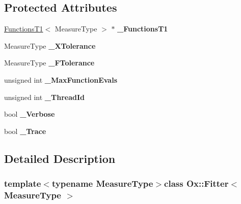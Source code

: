 \subsection*{Protected Attributes}
\begin{DoxyCompactItemize}
\item 
\hypertarget{class_ox_1_1_fitter_afc5005541eb8ee1741faf3f7fef9f112}{\hyperlink{class_ox_1_1_functions_t1}{Functions\-T1}$<$ Measure\-Type $>$ $\ast$ {\bfseries \-\_\-\-Functions\-T1}}\label{class_ox_1_1_fitter_afc5005541eb8ee1741faf3f7fef9f112}

\item 
\hypertarget{class_ox_1_1_fitter_af91a5ea8fb20072277ddcd64f5537b09}{Measure\-Type {\bfseries \-\_\-\-X\-Tolerance}}\label{class_ox_1_1_fitter_af91a5ea8fb20072277ddcd64f5537b09}

\item 
\hypertarget{class_ox_1_1_fitter_a926f6cf38998f041c31b079e93bf27ab}{Measure\-Type {\bfseries \-\_\-\-F\-Tolerance}}\label{class_ox_1_1_fitter_a926f6cf38998f041c31b079e93bf27ab}

\item 
\hypertarget{class_ox_1_1_fitter_a3be7ea1c1f19d3f4fb384474e2b1a033}{unsigned int {\bfseries \-\_\-\-Max\-Function\-Evals}}\label{class_ox_1_1_fitter_a3be7ea1c1f19d3f4fb384474e2b1a033}

\item 
\hypertarget{class_ox_1_1_fitter_a0d97d7a9c9fad0349484151464fefe4f}{unsigned int {\bfseries \-\_\-\-Thread\-Id}}\label{class_ox_1_1_fitter_a0d97d7a9c9fad0349484151464fefe4f}

\item 
\hypertarget{class_ox_1_1_fitter_a6457339f5252c85d7c92f20439544975}{bool {\bfseries \-\_\-\-Verbose}}\label{class_ox_1_1_fitter_a6457339f5252c85d7c92f20439544975}

\item 
\hypertarget{class_ox_1_1_fitter_a9ba79cb05ecc670254b3e7ddafc519ab}{bool {\bfseries \-\_\-\-Trace}}\label{class_ox_1_1_fitter_a9ba79cb05ecc670254b3e7ddafc519ab}

\end{DoxyCompactItemize}


\subsection{Detailed Description}
\subsubsection*{template$<$typename Measure\-Type$>$class Ox\-::\-Fitter$<$ Measure\-Type $>$}


